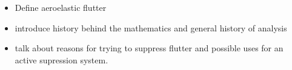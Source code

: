  
\begin{itemize}
    \item{Define aeroelastic flutter}
    \item{introduce history behind the mathematics and general history of analysis}
    \item{talk about reasons for trying to suppress flutter and possible uses for an active supression system.}
\end{itemize}
